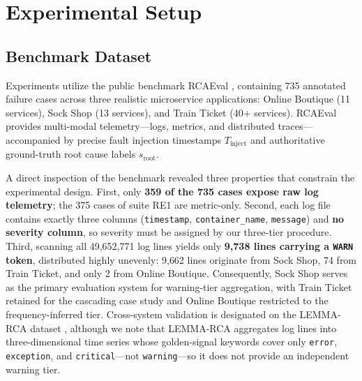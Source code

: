 \documentclass[conference]{IEEEtran}
\begin{document}
\section{Experimental Setup}
\subsection{Benchmark Dataset}
Experiments utilize the public benchmark RCAEval \cite{pham2025rcaeval}, containing 735 annotated failure cases across three realistic microservice applications: Online Boutique (11 services), Sock Shop (13 services), and Train Ticket (40+ services). RCAEval provides multi-modal telemetry---logs, metrics, and distributed traces---accompanied by precise fault injection timestamps $T_{\text{inject}}$ and authoritative ground-truth root cause labels $s_{\text{root}}$.

A direct inspection of the benchmark revealed three properties that constrain the experimental design. First, only \textbf{359 of the 735 cases expose raw log telemetry}; the 375 cases of suite RE1 are metric-only. Second, each log file contains exactly three columns (\texttt{timestamp}, \texttt{container\_name}, \texttt{message}) and \textbf{no severity column}, so severity must be assigned by our three-tier procedure. Third, scanning all 49{,}652{,}771 log lines yields only \textbf{9{,}738 lines carrying a \texttt{WARN} token}, distributed highly unevenly: 9{,}662 lines originate from Sock Shop, 74 from Train Ticket, and only 2 from Online Boutique. Consequently, Sock Shop serves as the primary evaluation system for warning-tier aggregation, with Train Ticket retained for the cascading case study and Online Boutique restricted to the frequency-inferred tier. Cross-system validation is designated on the LEMMA-RCA dataset \cite{zheng2024lemma}, although we note that LEMMA-RCA aggregates log lines into three-dimensional time series whose golden-signal keywords cover only \texttt{error}, \texttt{exception}, and \texttt{critical}---not \texttt{warning}---so it does not provide an independent warning tier.
\end{document}
